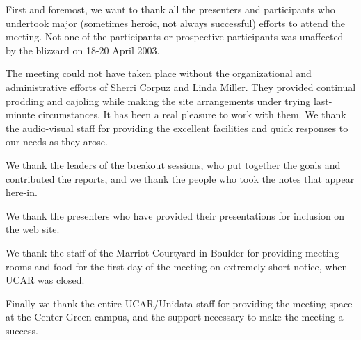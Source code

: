 First and foremost, we want to thank all the presenters and participants
who undertook major (sometimes heroic, not always successful) efforts
to attend the meeting.  Not one of the participants or prospective
participants was unaffected by the blizzard on 18-20 April 2003.

The meeting could not have taken place without the organizational
and administrative efforts of Sherri Corpuz and Linda Miller.
They provided continual prodding and cajoling while making the
site arrangements under trying last-minute circumstances.  It has
been a real pleasure to work with them.  We thank the audio-visual
staff for providing the excellent facilities and quick responses
to our needs as they arose.

We thank the leaders of the breakout sessions, who put together
the goals and contributed the reports, and we thank the people
who took the notes that appear here-in.  

We thank the presenters who have provided their presentations for
inclusion on the web site.

We thank the staff of the Marriot Courtyard in Boulder for providing
meeting rooms and food for the first day of the meeting on
extremely short notice, when UCAR was closed.

Finally we thank the entire UCAR/Unidata staff for providing the meeting
space at the Center Green campus, and the support necessary to 
make the meeting a success.

%
%
%
%

